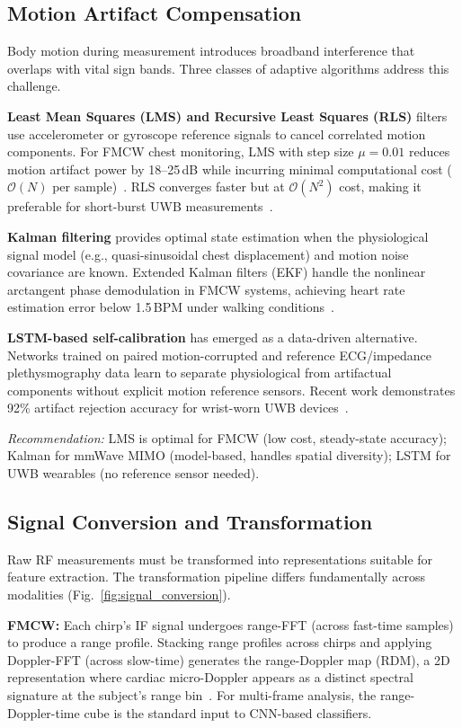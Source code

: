 \documentclass[journal,twoside]{IEEEtran}
\begin{document}
\subsection{Motion Artifact Compensation}

Body motion during measurement introduces broadband interference that overlaps with vital sign bands. Three classes of adaptive algorithms address this challenge.

\textbf{Least Mean Squares (LMS) and Recursive Least Squares (RLS)} filters use accelerometer or gyroscope reference signals to cancel correlated motion components. For FMCW chest monitoring, LMS with step size $\mu=0.01$ reduces motion artifact power by 18--25\,dB while incurring minimal computational cost ($\mathcal{O}(N)$ per sample)~\cite{ref_highprec_mmwave2024}. RLS converges faster but at $\mathcal{O}(N^2)$ cost, making it preferable for short-burst UWB measurements~\cite{ref_v2ifi2023}.

\textbf{Kalman filtering} provides optimal state estimation when the physiological signal model (e.g., quasi-sinusoidal chest displacement) and motion noise covariance are known. Extended Kalman filters (EKF) handle the nonlinear arctangent phase demodulation in FMCW systems, achieving heart rate estimation error below 1.5\,BPM under walking conditions~\cite{ref_radar_complex2025}.

\textbf{LSTM-based self-calibration} has emerged as a data-driven alternative. Networks trained on paired motion-corrupted and reference ECG/impedance plethysmography data learn to separate physiological from artifactual components without explicit motion reference sensors. Recent work demonstrates 92\% artifact rejection accuracy for wrist-worn UWB devices~\cite{ref_iradar2024}.

\textit{Recommendation:} LMS is optimal for FMCW (low cost, steady-state accuracy); Kalman for mmWave MIMO (model-based, handles spatial diversity); LSTM for UWB wearables (no reference sensor needed).


\subsection{Signal Conversion and Transformation}

Raw RF measurements must be transformed into representations suitable for feature extraction. The transformation pipeline differs fundamentally across modalities (Fig.~\ref{fig:signal_conversion}).

\textbf{FMCW:} Each chirp's IF signal undergoes range-FFT (across fast-time samples) to produce a range profile. Stacking range profiles across chirps and applying Doppler-FFT (across slow-time) generates the range-Doppler map (RDM), a 2D representation where cardiac micro-Doppler appears as a distinct spectral signature at the subject's range bin~\cite{ref_comprehensive_dataset2024}. For multi-frame analysis, the range-Doppler-time cube is the standard input to CNN-based classifiers.
\end{document}
